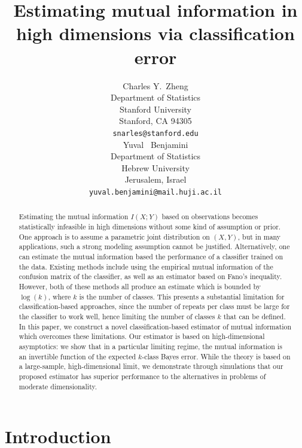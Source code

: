 \documentclass{article}
\title{Estimating mutual information in high dimensions via classification error}
\author{
  Charles Y.~Zheng \\
  Department of Statistics\\
  Stanford University\\
  Stanford, CA 94305 \\
  \texttt{snarles@stanford.edu} \\
  \And
  Yuval ~Benjamini \\
  Department of Statistics \\
  Hebrew University\\
  Jerusalem, Israel\\
  \texttt{yuval.benjamini@mail.huji.ac.il}
}
\begin{document}

\maketitle

\begin{abstract}
Estimating the mutual information $I(X; Y)$ based on observations
becomes statistically infeasible in high dimensions without some kind
of assumption or prior.  One approach is to assume a parametric joint
distribution on $(X, Y)$, but in many applications, such a strong
modeling assumption cannot be justified.  Alternatively, one can
estimate the mutual information based the performance of a classifier
trained on the data.  Existing methods include using the empirical
mutual information of the confusion matrix of the classifier, as well
as an estimator based on Fano's inequality.  However, both of these
methods all produce an estimate which is bounded by $\log(k)$, where
$k$ is the number of classes.  This presents a substantial limitation
for classification-based approaches, since the number of repeats per
class must be large for the classifier to work well, hence limiting
the number of classes $k$ that can be defined. In this paper, we
construct a novel classification-based estimator of mutual information
which overcomes these limitations.  Our estimator is based on
high-dimensional asymptotics: we show that in a particular limiting
regime, the mutual information is an invertible function of the
expected $k$-class Bayes error.  While the theory is based on a
large-sample, high-dimensional limit, we demonstrate through
simulations that our proposed estimator has superior
performance to the alternatives in problems of moderate
dimensionality.
\end{abstract}

\section{Introduction}
\end{document}
